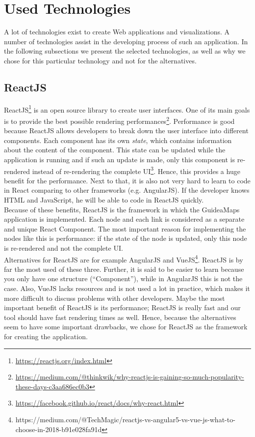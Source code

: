 \section{Used Technologies}\label{sec:technologies}
A lot of technologies exist to create Web applications and visualizations. A number of technologies assist in the developing process of such an application. In the following subsections we present the selected technologies, as well as why we chose for this particular technology and not for the alternatives.

\subsection{ReactJS}\label{sec:reactjs}
ReactJS\footnote{\url{https://reactjs.org/index.html}} is an open source library to create user interfaces. One of its main goals is to provide the best possible rendering performances\footnote{\url{https://medium.com/@thinkwik/why-reactjs-is-gaining-so-much-popularity-these-days-c3aa686ec0b3}}. Performance is good because ReactJS allows developers to break down the user interface into different components. Each component has its own \textit{state}, which contains information about the content of the component. This state can be updated while the application is running and if such an update is made, only this component is re-rendered instead of re-rendering the complete UI\footnote{\url{https://facebook.github.io/react/docs/why-react.html}}. Hence, this provides a huge benefit for the performance. Next to that, it is also not very hard to learn to code in React comparing to other frameworks (e.g. AngularJS). If the developer knows HTML and JavaScript, he will be able to code in ReactJS quickly.\\

Because of these benefits, ReactJS is the framework in which the GuideaMaps application is implemented. Each node and each link is considered as a separate and unique React Component. The most important reason for implementing the nodes like this is performance: if the state of the node is updated, only this node is re-rendered and not the complete UI.\\

Alternatives for ReactJS are for example AngularJS and VueJS\footnote{https://medium.com/@TechMagic/reactjs-vs-angular5-vs-vue-js-what-to-choose-in-2018-b91e028fa91d}. ReactJS is by far the most used of these three. Further, it is said to be easier to learn because you only have one structure (``Component''), while in AngularJS this is not the case. Also, VueJS lacks resources and is not used a lot in practice, which makes it more difficult to discuss problems with other developers. Maybe the most important benefit of ReactJS is its performance; ReactJS is really fast and our tool should have fast rendering times as well. Hence, because the alternatives seem to have some important drawbacks, we chose for ReactJS as the framework for creating the application. 

